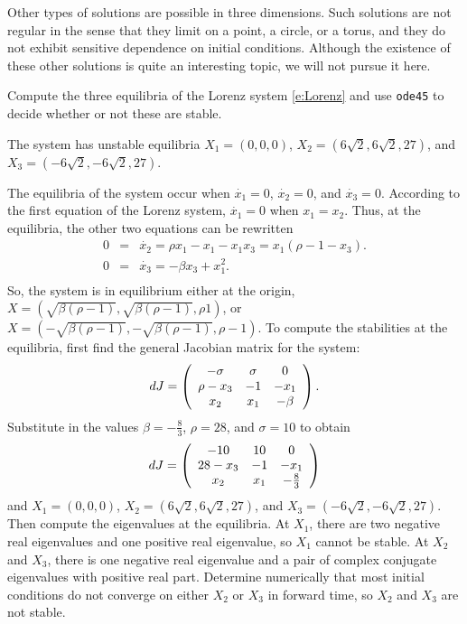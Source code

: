 \documentclass{ximera}
\begin{document}
Other types of solutions are possible in three dimensions.  Such solutions
are not regular in the sense that they limit on a point, a circle, or a
torus, and they do not exhibit sensitive dependence on initial conditions.  
Although the existence of these other solutions is quite an interesting
topic, we will not pursue it here. 


\EXER

\CEXER



\begin{exercise} \label{c11.4.1}
Compute the three equilibria of the Lorenz system \eqref{e:Lorenz}
and use {\tt ode45} to decide whether or not these are stable.

\begin{solution}
\ans The system has unstable equilibria $X_1 = (0,0,0)$, 
$X_2 = (6\sqrt{2},6\sqrt{2},27)$, and $X_3 = (-6\sqrt{2},-6\sqrt{2},27)$.

\soln The equilibria of the system occur when $\dot{x_1} = 0$, $\dot{x_2}
= 0$, and $\dot{x_3} = 0$.  According to the first equation of the Lorenz
system, $\dot{x_1} = 0$ when $x_1 = x_2$.  Thus, at the equilibria, the
other two equations can be rewritten
\[
\begin{array}{rcl}
0 & = & \dot{x_2} = \rho x_1 - x_1 - x_1x_3 = x_1(\rho - 1 - x_3). \\
0 & = & \dot{x_3} = -\beta x_3 + x_1^2. \\
\end{array}
\]
So, the system is in equilibrium either at the origin, $X =
(\sqrt{\beta (\rho - 1)}, \sqrt{\beta (\rho - 1)}, \rho 1)$, or
$X = (-\sqrt{\beta (\rho - 1)}, -\sqrt{\beta (\rho - 1)}, \rho - 1)$.
To compute the stabilities at the equilibria, first find the general
Jacobian matrix for the system:
\[
dJ = \left(\begin{array}{ccc} -\sigma & \sigma & 0 \\ \rho - x_3 & -1 & -x_1 \\ x_2 & x_1 & -\beta\end{array}\right).
\]
Substitute in the values $\beta = -\frac{8}{3}$, $\rho = 28$, and $\sigma
= 10$ to obtain
\[
dJ = \left(\begin{array}{ccc} -10 & 10 & 0 \\ 28 - x_3 & -1 & -x_1 \\ x_2 & x_1 & -\frac{8}{3}\end{array}\right)
\]
and $X_1 = (0,0,0)$, $X_2 = (6\sqrt{2},6\sqrt{2},27)$, and
$X_3 = (-6\sqrt{2},-6\sqrt{2},27)$.  Then compute the eigenvalues at the
equilibria.  At $X_1$, there are two negative real eigenvalues and one 
positive real eigenvalue, so $X_1$ cannot be stable.  At $X_2$ and $X_3$,
there is one negative real eigenvalue and a pair of complex conjugate
eigenvalues with positive real part.  Determine numerically that most
initial conditions do not converge on either $X_2$ or $X_3$ in forward time,
so $X_2$ and $X_3$ are not stable.


\end{solution}
\end{exercise}
\end{document}
